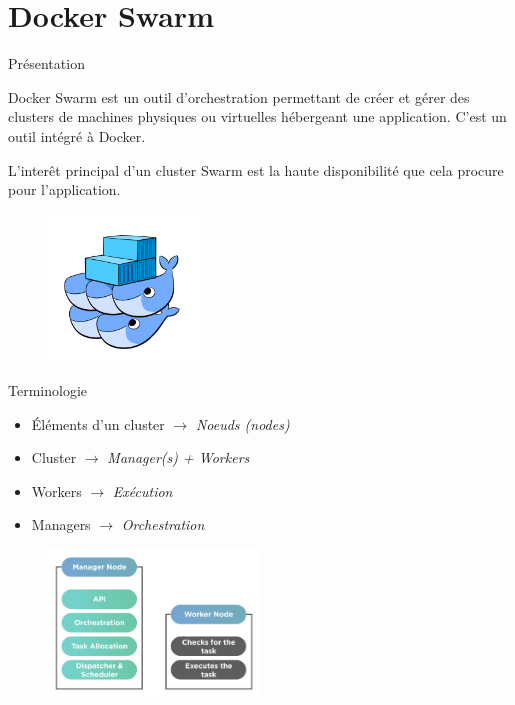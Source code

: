 \documentclass{cubeamer}
\newcommand{\arrow}{$\rightarrow$ }
\begin{document}
\section{Docker Swarm}

\begin{frame}{Présentation}
    \begin{multicols}{2}
    Docker Swarm est un outil d'orchestration permettant de créer et gérer des clusters de
    machines physiques ou virtuelles hébergeant une application. C'est un outil intégré à Docker.

    L'interêt principal d'un cluster Swarm est la haute disponibilité que cela procure pour
    l'application.

    \columnbreak
    \begin{figure}
        \centering
        \includegraphics[width=4cm]{img/swarm}
    \end{figure}

    \end{multicols}
\end{frame}

\begin{frame}{Terminologie}
    \begin{multicols}{2}
        \begin{itemize}
            \item Éléments d'un cluster \arrow \emph{Noeuds (nodes)}
            \item Cluster \arrow \emph{Manager(s) + Workers}
            \item Workers \arrow \emph{Exécution}
            \item Managers \arrow \emph{Orchestration}
        \end{itemize}
    \columnbreak
        \begin{figure}
            \centering
            \includegraphics[width=0.5\textwidth]{img/manager}
        \end{figure}
    \end{multicols}
\end{frame}
\end{document}
